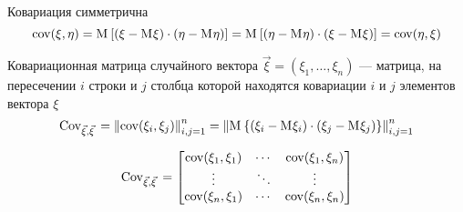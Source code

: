 \begin{remark}
    Ковариация симметрична
    $$\mathrm{cov}\!\left( \xi, \eta \right)
        = \mathrm{M}_{} \left[ \left( \xi - \mathrm{M}_{} \xi \right)
            \cdot \left( \eta - \mathrm{M}_{} \eta \right) \right]
        = \mathrm{M}_{} \left[ \left( \eta - \mathrm{M}_{} \eta \right)
            \cdot \left( \xi - \mathrm{M}_{} \xi \right) \right]
        =\mathrm{cov}\!\left( \eta, \xi \right)$$
\end{remark}

\begin{definition}
    \begin{comment}
    Ковариационная матрица двух случайных векторов
    $\vec{\xi} = \left( \xi_1, \dots, \xi_n \right)$ и
    $\vec{\eta} = \left( \eta_1, \dots, \eta_n \right)$ --- матрица, в которой
    на пересечении $i$ строки и $j$ столбца стоит ковариация случайных величин
    $\xi_i$ и $\eta_j$
    $$\Cov{\vec{\xi}}{\vec{\eta}}
        = \left\| \cov{\xi_i, \eta_j} \right\|_{i,j=1}^n
        = \left\| \mean{
            \left\{ \left( \xi_i - \mean{\xi_i} \right)
                \cdot \left( \eta_j - \mean{\eta_j} \right)
            \right\}} \right\|_{i,j=1}^n$$

    $$\Cov{\vec{\xi}}{\vec{\eta}} =
    \begin{bmatrix}
        \cov{\xi_1, \eta_1} & \cdots & \cov{\xi_1, \eta_n} \\
        \vdots & \ddots & \vdots \\
        \cov{\xi_n, \eta_1} & \cdots & \cov{\xi_n, \eta_n}
    \end{bmatrix}$$
    \end{comment}

    Ковариационная матрица случайного вектора
    $\vec{\xi} = \left( \xi_1, \dots, \xi_n \right)$ --- матрица, на пересечении
    $i$ строки и $j$ столбца которой находятся ковариации $i$ и $j$ элементов
    вектора $\xi$
    $$\mathrm{Cov}_{\vec{\xi}, \vec{\xi}}\,
        = \left\| \mathrm{cov}\!\left( \xi_i, \xi_j \right) \right\|_{i,j=1}^n
        = \left\| \mathrm{M}_{} 
            \left\{ \left( \xi_i - \mathrm{M}_{} \xi_i \right)
                \cdot \left( \xi_j - \mathrm{M}_{} \xi_j \right)
            \right\} \right\|_{i,j=1}^n$$

    $$\mathrm{Cov}_{\vec{\xi}, \vec{\xi}}\, =
    \begin{bmatrix}
        \mathrm{cov}\!\left( \xi_1, \xi_1 \right) & \cdots & \mathrm{cov}\!\left( \xi_1, \xi_n \right) \\
        \vdots & \ddots & \vdots \\
        \mathrm{cov}\!\left( \xi_n, \xi_1 \right) & \cdots & \mathrm{cov}\!\left( \xi_n, \xi_n \right)
    \end{bmatrix}$$

\end{definition}

